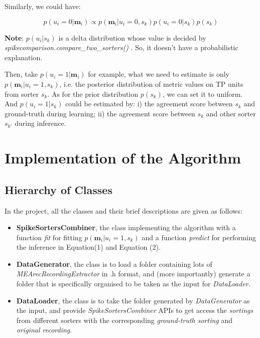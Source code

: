 \documentclass[12pt]{article}
\begin{document}
Similarly, we could have:

\begin{equation}
    p(u_i=0|\mathbf{m}_i)  \propto p(\mathbf{m}_i|u_i=0, s_k) p(u_i=0|s_k) p(s_k) \label{eq:postorior_prob_FP}
\end{equation}

\textbf{Note}: $p(u_i|s_k)$ is a delta distribution whose value is decided by \textit{ spikecomparison.compare\_two\_sorters() }.
So, it doesn't have a probabilistic explanation.

Then, take $p(u_i=1|\mathbf{m}_i)$ for example, what we need to estimate is only $p(\mathbf{m}_i | u_i=1, s_k)$, i.e. the posterior distribution of metric values on TP units from sorter $s_k$.
As for the prior distribution $p(s_k)$, we can set it to uniform.
And $p(u_i=1|s_k)$ could be estimated by: i) the agreement score between $s_k$ and ground-truth during learning; ii) the agreement score between $s_k$ and other sorter $s_{k'}$ during inference. 

\section{Implementation of the Algorithm}
\label{sec:implementation}

\subsection{Hierarchy of Classes}
\label{ssec:hierarchy}

In the project, all the classes and their brief descriptions are given as follows:

\begin{itemize}
    \item \textbf{SpikeSortersCombiner}, the class implementing the algorithm with a function \textit{fit} for fitting $p(\mathbf{m}_i | u_i=1, s_k)$ and a function \textit{predict} for performing the inference in Equation(1) and Equation (2).
    \item \textbf{DataGenerator}, the class is to load a folder containing lots of \textit{MEArecRecordingExtractor} in .h format, and (more importantly) generate a folder that is specifically organised to be taken as the input for \textit{DataLoader}.
    \item \textbf{DataLoader}, the class is to take the folder generated by \textit{DataGenerator} as the input, and provide \textit{SpikeSortersCombiner} APIs to get access the \textit{sortings} from different sorters with the corresponding \textit{ground-truth sorting} and \textit{original recording}.
\end{itemize}
\end{document}

